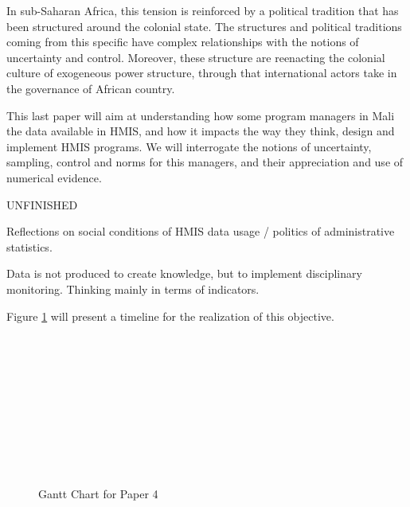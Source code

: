 In sub-Saharan Africa, this tension is reinforced by a political tradition that has been structured around the colonial state. The structures and political traditions coming from this specific have complex relationships with the notions of uncertainty and control. Moreover, these structure are reenacting the colonial culture of exogeneous power structure, through that international actors take in the governance of African country.

This last paper will aim at understanding how some program managers in Mali the data available in HMIS, and how it impacts the way they think, design and implement HMIS programs. We will interrogate the notions of uncertainty, sampling, control and norms for this managers, and their appreciation and use of numerical evidence.

UNFINISHED

Reflections on social conditions of HMIS data usage  / politics of administrative statistics.

Data is not produced to create knowledge, but to implement disciplinary monitoring. Thinking mainly in terms of indicators.


    Figure \ref{Gantt4} will present a timeline for the realization of this objective.

    \begin{figure}[h]
    \begin{ganttchart}{1}{24}
     \\
     \\
     \\
     \\
     \\
     \\
     \\
     \\
     \\
    \end{ganttchart}
    \caption{Gantt Chart for Paper 4}
    \label{Gantt4}
    \end{figure}
